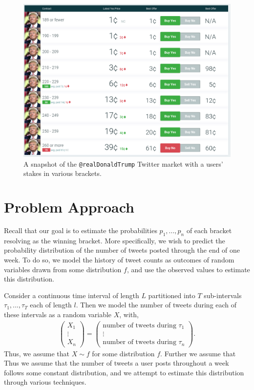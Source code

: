 \documentclass{article}
\begin{document}
\begin{figure}[h!]
    \centering
    \includegraphics[width=1.0\textwidth]{market}
    \caption{A snapshot of the \lstinline{@realDonaldTrump} Twitter market with a users' stakes in various brackets.}
    \label{market_graphic}
\end{figure}

\section{Problem Approach}
Recall that our goal is to estimate the probabilities $p_1,...,p_n$ of each bracket resolving as the winning bracket. More specifically,
we wish to predict the probability distribution of the number of tweets posted through the end of one week. To do so,
we model the history of tweet counts as outcomes of random variables drawn from some distribution $f$, and use the observed
values to estimate this distribution.

Consider a continuous time interval of length $L$ partitioned into $T$ sub-intervals
$\tau_1,...,\tau_T$ each of length $l$. Then we model the number of tweets during each of these intervals as a random variable $X$, with,
\begin{align*}
\begin{pmatrix}
    X_1\\ \vdots \\X_n
\end{pmatrix} = 
\begin{pmatrix}
    \text{number of tweets during } \tau_1
    \\ \vdots \\
    \text{number of tweets during } \tau_n
\end{pmatrix}.
\end{align*}
Thus, we assume that $X \sim f$ for some distribution $f$. Further we assume that 
Thus we assume that the number of tweets a user posts throughout a week follows some constant
distribution, and we attempt to estimate this distribution through various techniques.
\end{document}
